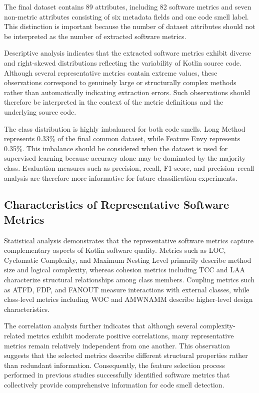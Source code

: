 \documentclass[]{einformatica}
\begin{document}
The final dataset contains 89 attributes, including 82 software metrics and seven non-metric attributes consisting of six metadata fields and one code smell label. This distinction is important because the number of dataset attributes should not be interpreted as the number of extracted software metrics.

Descriptive analysis indicates that the extracted software metrics exhibit diverse and right-skewed distributions reflecting the variability of Kotlin source code. Although several representative metrics contain extreme values, these observations correspond to genuinely large or structurally complex methods rather than automatically indicating extraction errors. Such observations should therefore be interpreted in the context of the metric definitions and the underlying source code.

The class distribution is highly imbalanced for both code smells. Long Method represents 0.33\% of the final common dataset, while Feature Envy represents 0.35\%. This imbalance should be considered when the dataset is used for supervised learning because accuracy alone may be dominated by the majority class. Evaluation measures such as precision, recall, F1-score, and precision--recall analysis are therefore more informative for future classification experiments.

\subsection{Characteristics of Representative Software Metrics}

Statistical analysis demonstrates that the representative software metrics capture complementary aspects of Kotlin software quality. Metrics such as LOC, Cyclomatic Complexity, and Maximum Nesting Level primarily describe method size and logical complexity, whereas cohesion metrics including TCC and LAA characterize structural relationships among class members. Coupling metrics such as ATFD, FDP, and FANOUT measure interactions with external classes, while class-level metrics including WOC and AMWNAMM describe higher-level design characteristics.

The correlation analysis further indicates that although several complexity-related metrics exhibit moderate positive correlations, many representative metrics remain relatively independent from one another. This observation suggests that the selected metrics describe different structural properties rather than redundant information. Consequently, the feature selection process performed in previous studies successfully identified software metrics that collectively provide comprehensive information for code smell detection.
\end{document}
